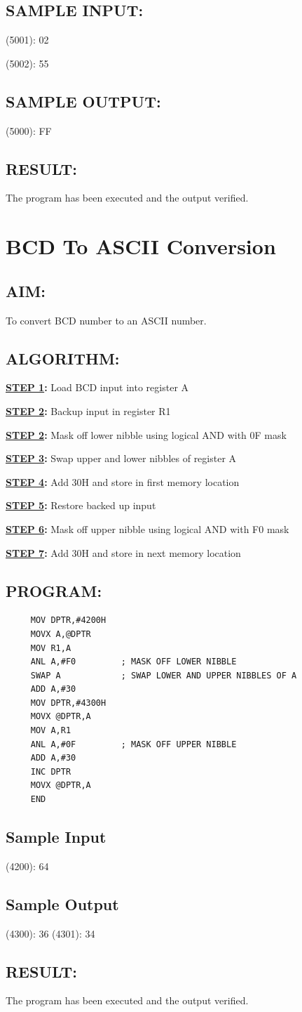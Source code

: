 \documentclass[a4paper,28pt]{report}
\begin{document}
\section*{SAMPLE INPUT:}
(5001): 02

(5002): 55
\section*{SAMPLE OUTPUT:}
(5000): FF
\section*{RESULT:}
The program has been executed and the output verified.
%
%
\chapter{BCD To ASCII Conversion}
%
%
\section*{AIM:}
To convert BCD number to an ASCII number.

\section*{ALGORITHM:}

\textbf{\underline{STEP 1}:} Load BCD input into register A

\textbf{\underline{STEP 2}:} Backup input in register R1

\textbf{\underline{STEP 2}:} Mask off lower nibble using logical AND with 0F mask

\textbf{\underline{STEP 3}:} Swap upper and lower nibbles of register A

\textbf{\underline{STEP 4}:} Add 30H and store in first memory location

\textbf{\underline{STEP 5}:} Restore backed up input

\textbf{\underline{STEP 6}:} Mask off upper nibble using logical AND with F0 mask

\textbf{\underline{STEP 7}:} Add 30H and store in next memory location

\section*{PROGRAM:}

\begin{lstlisting}
     MOV DPTR,#4200H
     MOVX A,@DPTR
     MOV R1,A 
     ANL A,#F0         ; MASK OFF LOWER NIBBLE
     SWAP A            ; SWAP LOWER AND UPPER NIBBLES OF A 
     ADD A,#30
     MOV DPTR,#4300H
     MOVX @DPTR,A 
     MOV A,R1
     ANL A,#0F         ; MASK OFF UPPER NIBBLE
     ADD A,#30
     INC DPTR
     MOVX @DPTR,A
     END
\end{lstlisting}

\section*{Sample Input}
(4200): 64
\section*{Sample Output}
(4300): 36 
(4301): 34 

\section*{RESULT:}
The program has been executed and the output verified.
%
%
\end{document}
